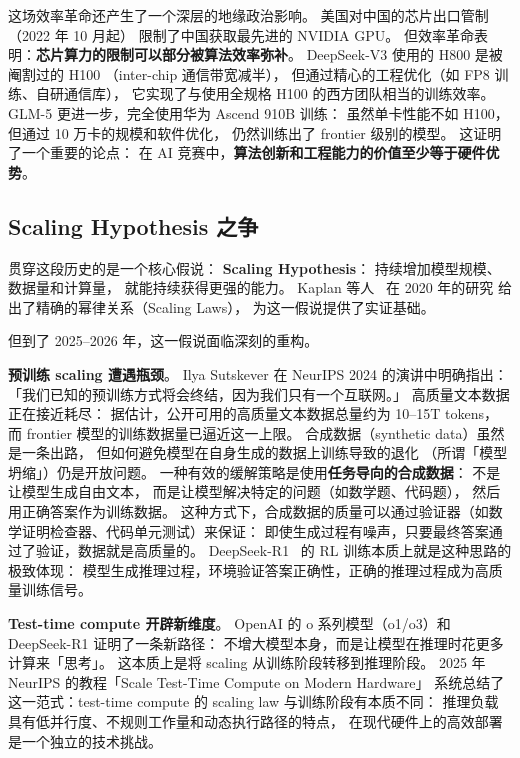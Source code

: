 这场效率革命还产生了一个深层的地缘政治影响。
美国对中国的芯片出口管制（2022 年 10 月起）
限制了中国获取最先进的 NVIDIA GPU。
但效率革命表明：\textbf{芯片算力的限制可以部分被算法效率弥补}。
DeepSeek-V3 使用的 H800 是被阉割过的 H100
（inter-chip 通信带宽减半），
但通过精心的工程优化（如 FP8 训练、自研通信库），
它实现了与使用全规格 H100 的西方团队相当的训练效率。
GLM-5 更进一步，完全使用华为 Ascend 910B 训练：
虽然单卡性能不如 H100，但通过 10 万卡的规模和软件优化，
仍然训练出了 frontier 级别的模型。
这证明了一个重要的论点：
在 AI 竞赛中，\textbf{算法创新和工程能力的价值至少等于硬件优势}。

\subsection{Scaling Hypothesis 之争}

贯穿这段历史的是一个核心假说：
\textbf{Scaling Hypothesis}：
持续增加模型规模、数据量和计算量，
就能持续获得更强的能力。
Kaplan 等人~\cite{kaplan2020scaling} 在 2020 年的研究
给出了精确的幂律关系（Scaling Laws），
为这一假说提供了实证基础。

但到了 2025--2026 年，这一假说面临深刻的重构。

\textbf{预训练 scaling 遭遇瓶颈}。
Ilya Sutskever 在 NeurIPS 2024 的演讲中明确指出：
「我们已知的预训练方式将会终结，因为我们只有一个互联网。」
高质量文本数据正在接近耗尽：
据估计，公开可用的高质量文本数据总量约为 10--15T tokens，
而 frontier 模型的训练数据量已逼近这一上限。
合成数据（synthetic data）虽然是一条出路，
但如何避免模型在自身生成的数据上训练导致的退化
（所谓「模型坍缩」）仍是开放问题。
一种有效的缓解策略是使用\textbf{任务导向的合成数据}：
不是让模型生成自由文本，
而是让模型解决特定的问题（如数学题、代码题），
然后用正确答案作为训练数据。
这种方式下，合成数据的质量可以通过验证器（如数学证明检查器、代码单元测试）来保证：
即使生成过程有噪声，只要最终答案通过了验证，数据就是高质量的。
DeepSeek-R1~\cite{deepseekr1} 的 RL 训练本质上就是这种思路的极致体现：
模型生成推理过程，环境验证答案正确性，正确的推理过程成为高质量训练信号。

\textbf{Test-time compute 开辟新维度}。
OpenAI 的 o 系列模型（o1/o3）和 DeepSeek-R1 证明了一条新路径：
不增大模型本身，而是让模型在推理时花更多计算来「思考」。
这本质上是将 scaling 从训练阶段转移到推理阶段。
2025 年 NeurIPS 的教程「Scale Test-Time Compute on Modern Hardware」
系统总结了这一范式：test-time compute 的 scaling law
与训练阶段有本质不同：
推理负载具有低并行度、不规则工作量和动态执行路径的特点，
在现代硬件上的高效部署是一个独立的技术挑战。

